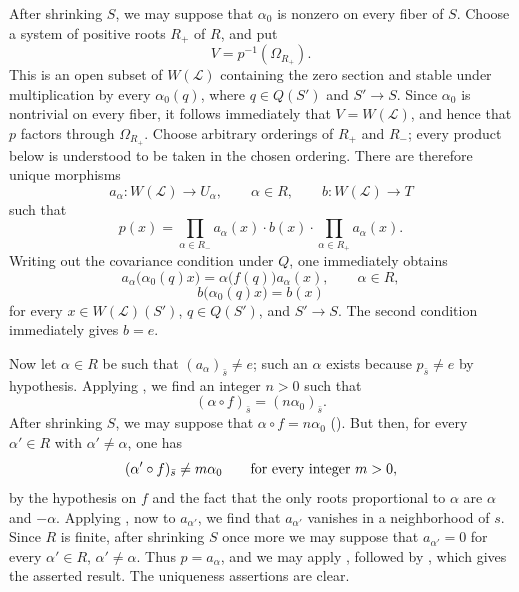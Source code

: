 After shrinking \(S\), we may suppose that \(\alpha_0\) is nonzero
on every fiber of \(S\). Choose a system of positive roots \(R_+\)
of \(R\), and put
\[
  V=p^{-1}(\Omega_{R_+}).
\]
This is an open subset of \(W(\mathcal L)\) containing the zero
section and stable under multiplication by every
\(\alpha_0(q)\), where \(q\in Q(S')\) and \(S'\to S\). Since
\(\alpha_0\) is nontrivial on every fiber, it follows immediately
that \(V=W(\mathcal L)\), and hence that \(p\) factors through
\(\Omega_{R_+}\). Choose arbitrary orderings of \(R_+\) and
\(R_-\); every product below is understood to be taken in the
chosen ordering. There are therefore unique morphisms
\[
  a_\alpha:W(\mathcal L)\longrightarrow U_\alpha,
  \qquad \alpha\in R,
  \qquad
  b:W(\mathcal L)\longrightarrow T
\]
such that
\[
  p(x)
  =
  \prod_{\alpha\in R_-}a_\alpha(x)\mathbin{\cdot}b(x)
  \mathbin{\cdot}\prod_{\alpha\in R_+}a_\alpha(x).
\]
Writing out the covariance condition under \(Q\), one immediately
obtains
\[
  a_\alpha\bigl(\alpha_0(q)x\bigr)
  =
  \alpha\bigl(f(q)\bigr)a_\alpha(x),
  \qquad \alpha\in R,
\]
\[
  b\bigl(\alpha_0(q)x\bigr)=b(x)
\]
for every \(x\in W(\mathcal L)(S')\), \(q\in Q(S')\), and
\(S'\to S\). The second condition immediately gives \(b=e\).

Now let \(\alpha\in R\) be such that
\((a_\alpha)_{\bar s}\ne e\); such an \(\alpha\) exists because
\(p_{\bar s}\ne e\) by hypothesis. Applying ,
we find an integer \(n>0\) such that
\[
  (\alpha\circ f)_{\bar s}=(n\alpha_0)_{\bar s}.
\]
After shrinking \(S\), we may suppose that
\(\alpha\circ f=n\alpha_0\) (). But then, for every
\(\alpha'\in R\) with \(\alpha'\ne\alpha\), one has
\[
  (\alpha'\circ f)_{\bar s}\ne m\alpha_0
  \qquad\textup{for every integer \(m>0\),}
\]
by the hypothesis on \(f\) and the fact that the only roots
proportional to \(\alpha\) are \(\alpha\) and \(-\alpha\).
Applying , now to \(a_{\alpha'}\), we find that
\(a_{\alpha'}\) vanishes in a neighborhood of \(s\).
Since \(R\) is finite, after shrinking \(S\) once more we may
suppose that \(a_{\alpha'}=0\) for every
\(\alpha'\in R\), \(\alpha'\ne\alpha\). Thus \(p=a_\alpha\), and
we may apply , followed by , which gives
the asserted result. The uniqueness assertions are clear.

